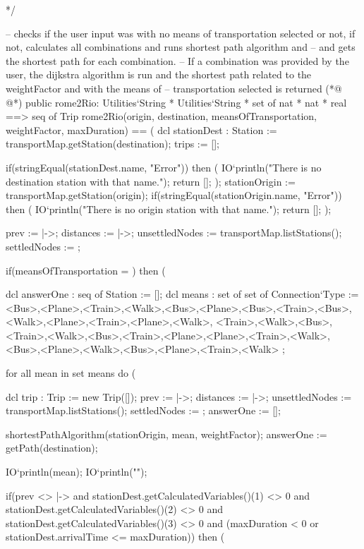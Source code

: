 \begin{vdmpp}[breaklines=true]
 */
 
 -- checks if the user input was with no means of transportation selected or not, if not, calculates all combinations and runs shortest path algorithm and
 -- and gets the shortest path for each combination.
 -- If a combination was provided by the user, the dijkstra algorithm is run and the shortest path related to the weightFactor and with the means of 
 -- transportation selected is returned
(*@
\label{rome2Rio:332}
@*)
 public rome2Rio: Utilities`String * Utilities`String * set of nat * nat * real ==> seq of Trip 
 rome2Rio(origin, destination, meansOfTransportation, weightFactor, maxDuration) ==
 (
  dcl stationDest : Station := transportMap.getStation(destination);
  trips := [];
  
  if(stringEqual(stationDest.name, "Error")) then (
    IO`println("There is no destination station with that name.");
    return [];
  );
  stationOrigin := transportMap.getStation(origin);
  if(stringEqual(stationOrigin.name, "Error")) then (
    IO`println("There is no origin station with that name.");
    return [];
  );
  
  prev := {|->};
  distances := {|->};
  unsettledNodes := transportMap.listStations();
  settledNodes := {};
 
  if(meansOfTransportation = {}) then (
   
   dcl answerOne : seq of Station := [];
   dcl means : set of set of Connection`Type := {
    {<Bus>},{<Plane>},{<Train>},{<Walk>},{<Bus>,<Plane>},{<Bus>,<Train>},{<Bus>,<Walk>},{<Plane>,<Train>},{<Plane>,<Walk>},
    {<Train>,<Walk>},{<Bus>,<Train>,<Walk>},{<Bus>,<Train>,<Plane>},{<Plane>,<Train>,<Walk>},{<Bus>,<Plane>,<Walk>},{<Bus>,<Plane>,<Train>,<Walk>}
   };
   
   for all mean in set means do (
    
    dcl trip : Trip := new Trip([]);
    prev := {|->};
    distances := {|->};
    unsettledNodes := transportMap.listStations();
    settledNodes := {};
    answerOne := [];
        
    
    shortestPathAlgorithm(stationOrigin, mean, weightFactor);
    answerOne := getPath(destination);
    
    IO`println(mean);
    IO`println("\n\n");
    
    if(prev <> {|->} and stationDest.getCalculatedVariables()(1) <> 0 
     and stationDest.getCalculatedVariables()(2) <> 0 and stationDest.getCalculatedVariables()(3) <> 0 
     and (maxDuration < 0 or stationDest.arrivalTime <= maxDuration)) then (
    

\end{vdmpp}

